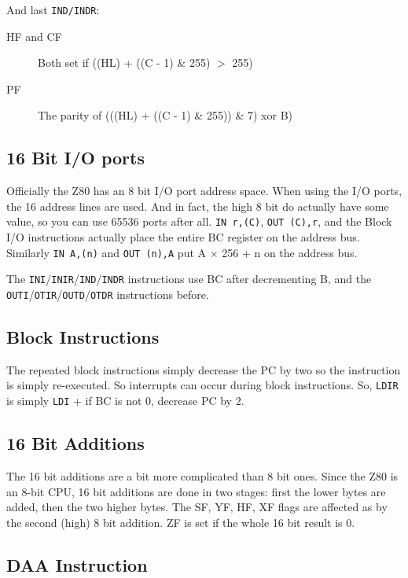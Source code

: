 \documentclass[twoside,openright,a4paper]{book}
\begin{document}
And last {\tt IND/INDR}:

\begin{description}

	\item[HF and CF]
	Both set if ((HL) + ((C - 1) \& 255) $>$ 255)

	\item[PF]
	The parity of (((HL) + ((C - 1) \& 255)) \& 7) xor B)

\end{description}


\subsection{16 Bit I/O ports}

Officially the Z80 has an 8 bit I/O port address space. When using the I/O ports, the 16 address lines are used. And in fact, the high 8 bit do actually have some value, so you can use 65536 ports after all. {\tt IN r,(C)}, {\tt OUT (C),r}, and the Block I/O instructions  actually place the entire BC register on the address bus. Similarly {\tt IN A,(n)} and {\tt OUT (n),A} put A $\times$ 256 + n on the address bus.

The {\tt INI}/{\tt INIR}/{\tt IND}/{\tt INDR} instructions use BC after decrementing B, and the {\tt OUTI}/{\tt OTIR}/{\tt OUTD}/{\tt OTDR} instructions before.


\subsection{Block Instructions}

The repeated block instructions simply decrease the PC by two so the instruction is simply re-executed. So interrupts can occur during block instructions. So, {\tt LDIR} is simply {\tt LDI} + if BC is not 0, decrease PC by 2.


\subsection{16 Bit Additions}

The 16 bit additions are a bit more complicated than 8 bit ones. Since the Z80 is an 8-bit CPU, 16 bit additions are done in two stages: first the lower bytes are added, then the two higher bytes. The SF, YF, HF, XF flags are affected as by the second (high) 8 bit addition. ZF is set if the whole 16 bit result is 0.


\subsection{DAA Instruction}
\label{daa}
\end{document}
